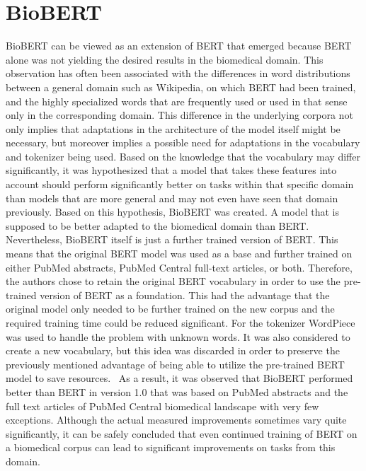 \section{BioBERT}
BioBERT can be viewed as an extension of BERT that emerged because BERT alone was not yielding the desired results in the biomedical domain. This observation has often been associated with the differences in word distributions between a general domain such as Wikipedia, on which BERT had been trained, and the highly specialized words that are frequently used or used in that sense only in the corresponding domain. This difference in the underlying corpora not only implies that adaptations in the architecture of the model itself might be necessary, but moreover implies a possible need for adaptations in the vocabulary and tokenizer being used. \cite{Lee2019} 
\newline
Based on the knowledge that the vocabulary may differ significantly, it was hypothesized that a model that takes these features into account should perform significantly better on tasks within that specific domain than models that are more general and may not even have seen that domain previously. Based on this hypothesis, BioBERT was created. A model that is supposed to be better adapted to the biomedical domain than BERT. 
\newline
Nevertheless, BioBERT itself is just a further trained version of BERT. This means that the original BERT model was used as a base and further trained on either PubMed abstracts, PubMed Central full-text articles, or both. Therefore, the authors chose to retain the original BERT vocabulary in order to use the pre-trained version of BERT as a foundation. This had the advantage that the original model only needed to be further trained on the new corpus and the required training time could be reduced significant. %
For the tokenizer WordPiece was used to handle the problem with unknown words. It was also considered to create a new vocabulary, but this idea was discarded in order to preserve the previously mentioned advantage of being able to utilize the pre-trained BERT model to save resources. 
As a result, it was observed that BioBERT performed better than BERT in version 1.0 that was based on PubMed abstracts and the full text articles of PubMed Central biomedical landscape with very few exceptions. Although the actual measured improvements sometimes vary quite significantly, it can be safely concluded that even continued training of BERT on a biomedical corpus can lead to significant improvements on tasks from this domain. 

